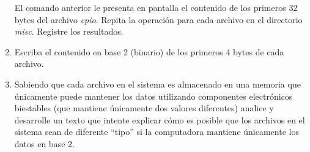 \documentclass[12pt]{article}
\begin{document}
\begin{enumerate}
        El comando anterior le presenta en pantalla el contenido de los
        primeros 32 bytes del archivo \emph{cpio}. Repita la operación para
        cada archivo en el directorio \emph{misc}. Registre los resultados.

    \item Escriba el contenido en base 2 (binario) de los primeros 4 bytes de
        cada archivo.

    \item Sabiendo que cada archivo en el sistema es almacenado en una memoria
        que únicamente puede mantener los datos utilizando componentes
        electrónicos biestables (que mantiene únicamente dos valores
        diferentes) analice y desarrolle un texto que intente explicar cómo es
        posible que los archivos en el sistema sean de diferente ``tipo'' si
        la computadora mantiene únicamente los datos en base 2.

\end{enumerate}
\end{document}
